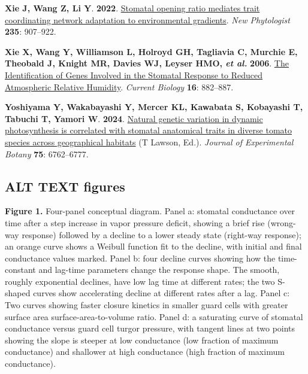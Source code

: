 \documentclass[
  letterpaper,
  DIV=11,
  numbers=noendperiod]{scrartcl}
\newlength{\cslhangindent}
\newenvironment{CSLReferences}[2] %
 {\begin{list}{}{%
  \setlength{\itemindent}{0pt}
  \setlength{\leftmargin}{0pt}
  \setlength{\parsep}{0pt}
  \ifodd #1
   \setlength{\leftmargin}{\cslhangindent}
   \setlength{\itemindent}{-1\cslhangindent}
  \fi
  \setlength{\itemsep}{#2\baselineskip}}}
 {\end{list}}
\begin{document}
\begin{CSLReferences}{0}{1}
\textbf{\textbf{Xie J}, \textbf{Wang Z}, \textbf{Li Y}}. \textbf{2022}.
\href{https://doi.org/10.1111/nph.18189}{Stomatal opening ratio mediates
trait coordinating network adaptation to environmental gradients}.
\emph{New Phytologist} \textbf{235}: 907--922.

\textbf{\textbf{Xie X}, \textbf{Wang Y}, \textbf{Williamson L},
\textbf{Holroyd GH}, \textbf{Tagliavia C}, \textbf{Murchie E},
\textbf{Theobald J}, \textbf{Knight MR}, \textbf{Davies WJ},
\textbf{Leyser HMO}, \emph{et al.}} \textbf{2006}.
\href{https://doi.org/10.1016/j.cub.2006.03.028}{The {Identification} of
{Genes Involved} in the {Stomatal Response} to {Reduced Atmospheric
Relative Humidity}}. \emph{Current Biology} \textbf{16}: 882--887.

\textbf{\textbf{Yoshiyama Y}, \textbf{Wakabayashi Y}, \textbf{Mercer
KL}, \textbf{Kawabata S}, \textbf{Kobayashi T}, \textbf{Tabuchi T},
\textbf{Yamori W}}. \textbf{2024}.
\href{https://doi.org/10.1093/jxb/erae082}{Natural genetic variation in
dynamic photosynthesis is correlated with stomatal anatomical traits in
diverse tomato species across geographical habitats} (T Lawson, Ed.).
\emph{Journal of Experimental Botany} \textbf{75}: 6762--6777.

\end{CSLReferences}

\newpage{}

\subsection{ALT TEXT figures}\label{alt-text-figures}

\textbf{Figure 1.} Four-panel conceptual diagram. Panel a: stomatal
conductance over time after a step increase in vapor pressure deficit,
showing a brief rise (wrong-way response) followed by a decline to a
lower steady state (right-way response); an orange curve shows a Weibull
function fit to the decline, with initial and final conductance values
marked. Panel b: four decline curves showing how the time-constant and
lag-time parameters change the response shape. The smooth, roughly
exponential declines, have low lag time at different rates; the two
S-shaped curves show accelerating decline at different rates after a
lag. Panel c: Two curves showing faster closure kinetics in smaller
guard cells with greater surface area surface-area-to-volume ratio.
Panel d: a saturating curve of stomatal conductance versus guard cell
turgor pressure, with tangent lines at two points showing the slope is
steeper at low conductance (low fraction of maximum conductance) and
shallower at high conductance (high fraction of maximum conductance).
\end{document}
